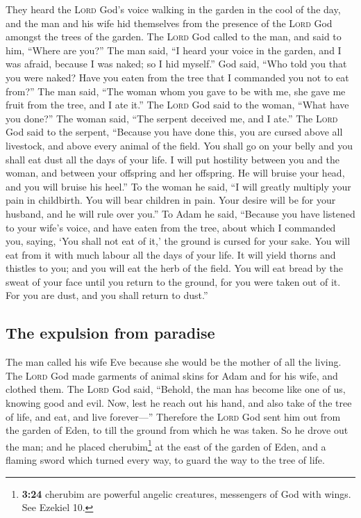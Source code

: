  They heard the \textsc{Lord} God's voice walking in the
garden in the cool of the day, and the man and his wife hid themselves
from the presence of the \textsc{Lord} God amongst the trees of the
garden.  The \textsc{Lord} God called to the man, and said
to him, ``Where are you?''  The man said, ``I heard your
voice in the garden, and I was afraid, because I was naked; so I hid
myself.''  God said, ``Who told you that you were naked?
Have you eaten from the tree that I commanded you not to eat from?''
 The man said, ``The woman whom you gave to be with me,
she gave me fruit from the tree, and I ate it.''  The
\textsc{Lord} God said to the woman, ``What have you done?'' The woman
said, ``The serpent deceived me, and I ate.''  The
\textsc{Lord} God said to the serpent, ``Because you have done this, you
are cursed above all livestock, and above every animal of the field. You
shall go on your belly and you shall eat dust all the days of your life.
 I will put hostility between you and the woman, and
between your offspring and her offspring. He will bruise your head, and
you will bruise his heel.''  To the woman he said, ``I
will greatly multiply your pain in childbirth. You will bear children in
pain. Your desire will be for your husband, and he will rule over you.''
 To Adam he said, ``Because you have listened to your
wife's voice, and have eaten from the tree, about which I commanded you,
saying, `You shall not eat of it,' the ground is cursed for your sake.
You will eat from it with much labour all the days of your life.
 It will yield thorns and thistles to you; and you will
eat the herb of the field.  You will eat bread by the
sweat of your face until you return to the ground, for you were taken
out of it. For you are dust, and you shall return to dust.''

\hypertarget{the-expulsion-from-paradise}{%
\subsection{The expulsion from
paradise}\label{the-expulsion-from-paradise}}

 The man called his wife Eve because she would be the
mother of all the living.  The \textsc{Lord} God made
garments of animal skins for Adam and for his wife, and clothed them.
 The \textsc{Lord} God said, ``Behold, the man has become
like one of us, knowing good and evil. Now, lest he reach out his hand,
and also take of the tree of life, and eat, and live forever---''
 Therefore the \textsc{Lord} God sent him out from the
garden of Eden, to till the ground from which he was taken.
 So he drove out the man; and he placed
cherubim\footnote{\textbf{3:24} cherubim are powerful angelic creatures,
  messengers of God with wings. See Ezekiel 10.} at the east of the
garden of Eden, and a flaming sword which turned every way, to guard the
way to the tree of life.

